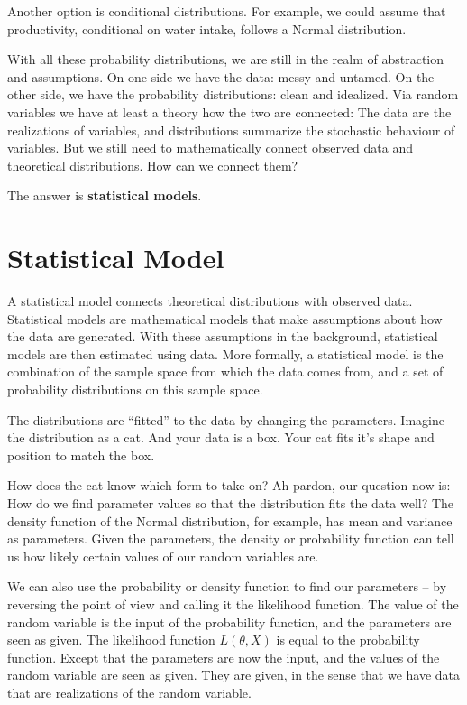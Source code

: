 \documentclass[
  10pt,
]{scrbook}
\begin{document}
Another option is conditional distributions.
For example, we could assume that productivity, conditional on water intake, follows a Normal distribution.

With all these probability distributions, we are still in the realm of abstraction and assumptions.
On one side we have the data: messy and untamed.
On the other side, we have the probability distributions: clean and idealized.
Via random variables we have at least a theory how the two are connected:
The data are the realizations of variables, and distributions summarize the stochastic behaviour of variables.
But we still need to mathematically connect observed data and theoretical distributions.
How can we connect them?

The answer is \textbf{statistical models}.

\hypertarget{statistical-model}{%
\section{Statistical Model}\label{statistical-model}}

A statistical model connects theoretical distributions with observed data.
Statistical models are mathematical models that make assumptions about how the data are generated.
With these assumptions in the background, statistical models are then estimated using data.
More formally, a statistical model is the combination of the sample space from which the data comes from, and a set of probability distributions on this sample space.

The distributions are ``fitted'' to the data by changing the parameters.
Imagine the distribution as a cat.
And your data is a box.
Your cat fits it's shape and position to match the box.

How does the cat know which form to take on?
Ah pardon, our question now is:
How do we find parameter values so that the distribution fits the data well?
The density function of the Normal distribution, for example, has mean and variance as parameters.
Given the parameters, the density or probability function can tell us how likely certain values of our random variables are.

We can also use the probability or density function to find our parameters -- by reversing the point of view and calling it the likelihood function.
The value of the random variable is the input of the probability function, and the parameters are seen as given.
The likelihood function \(L(\theta, X)\) is equal to the probability function.
Except that the parameters are now the input, and the values of the random variable are seen as given.
They are given, in the sense that we have data that are realizations of the random variable.
\end{document}
